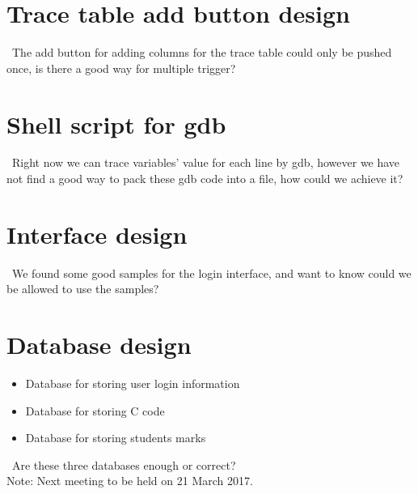 \documentclass[11pt, a4paper]{article}
\begin{document}
\section{Trace table add button design}
\ The add button for adding columns for the trace table could only be pushed once, is there a good way for multiple trigger? \\

\section{Shell script for gdb}
\ Right now we can trace variables' value for each line by gdb, however we have not find a good way to pack these gdb code into a file, how could we achieve it?\\

\section{Interface design}
\ We found  some good  samples for the login interface, and want to know could we be allowed to use the samples?\\

\section{Database design}
\begin {itemize} 
\item Database for storing user login information
\item Database for storing C code
\item Database for storing students marks
\end {itemize}
\ Are these three databases enough or correct?\\

\vspace*{10pt}
\noindent Note: Next meeting to be held on 21 March 2017.
\end{document}
